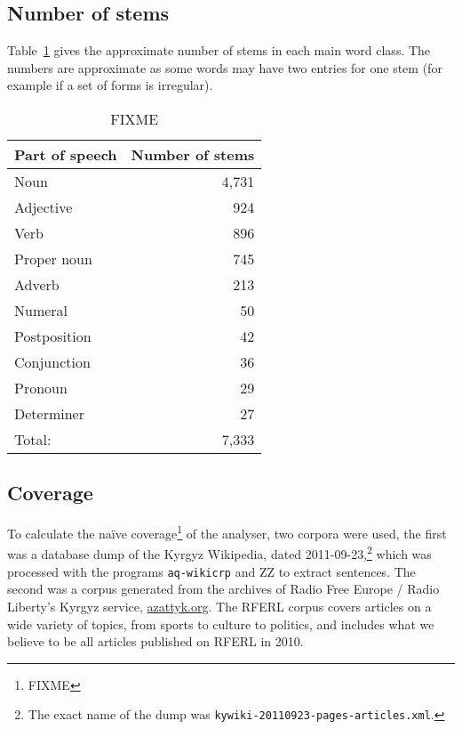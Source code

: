 \documentclass[a4paper,12pt,onecolumn,oneside]{article}
\begin{document}
\subsection{Number of stems}

Table~\ref{table:stems} gives the approximate number of stems in each main word class. The numbers
are approximate as some words may have two entries for one stem (for example if a set of forms
is irregular).

\begin{table}
	\centering
	\begin{tabular}{lr}
		\toprule
		Part of speech & Number of stems\\
		\midrule
		Noun & 4,731\\
		Adjective & 924\\
		Verb & 896 \\
		Proper noun & 745\\
		Adverb & 213\\
		Numeral & 50\\
		Postposition & 42\\
		Conjunction & 36\\
		Pronoun & 29\\
		Determiner & 27\\
		\midrule
		Total:     & 7,333\\
		\bottomrule
	\end{tabular}
	\caption{FIXME}\label{table:stems}
\end{table}


\subsection{Coverage}

To calculate the naïve coverage\footnote{FIXME} of the analyser, two corpora were used, the first was a database dump of the Kyrgyz Wikipedia, dated 2011-09-23,\footnote{The exact name of the dump was \texttt{kywiki-20110923-pages-articles.xml}.} which was processed with the programs \texttt{aq-wikicrp} and ZZ to extract sentences. The second was a corpus generated from the archives of Radio Free Europe / Radio Liberty's Kyrgyz service, \href{http://www.azattyk.org}{azattyk.org}.  The RFERL corpus covers articles on a wide variety of topics, from sports to culture to politics, and includes what we believe to be all articles published on RFERL in 2010.
\end{document}
